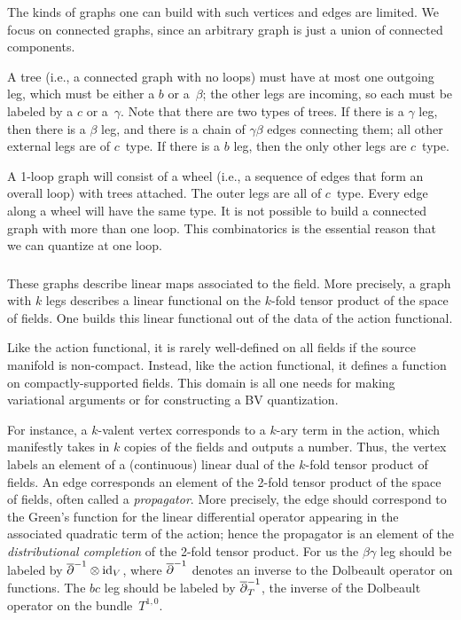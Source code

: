 The kinds of graphs one can build with such vertices and edges are limited.
We focus on connected graphs, since an arbitrary graph is just a union of connected components.

A tree (i.e., a connected graph with no loops) must have at most one outgoing leg,
which must be either a $b$ or a~$\beta$;
the other legs are incoming, so each must be labeled by a $c$ or a~$\gamma$.
Note that there are two types of trees.
If there is a $\gamma$ leg, then there is a $\beta$ leg,
and there is a chain of $\gamma\beta$ edges connecting them;
all other external legs are of $c$~type.
If there is a $b$ leg, then the only other legs are $c$~type.

A 1-loop graph will consist of a wheel (i.e., a sequence of edges that form an overall loop)
with trees attached.
The outer legs are all of $c$~type.
Every edge along a wheel will have the same type.
It is not possible to build a connected graph with more than one loop.
This combinatorics is the essential reason that we can quantize at one loop.

\subsubsection{}

These graphs describe linear maps associated to the field.
More precisely, a graph with $k$ legs describes a linear functional on the $k$-fold tensor product of the space of fields.
One builds this linear functional out of the data of the action functional.

\begin{rmk}
Like the action functional, it is rarely well-defined on all fields if the source manifold is non-compact.
Instead, like the action functional, it defines a function on compactly-supported fields.
This domain is all one needs for making variational arguments or for constructing a BV quantization.
\end{rmk}

For instance, a $k$-valent vertex corresponds to a $k$-ary term in the action,
which manifestly takes in $k$ copies of the fields and outputs a number.
Thus, the vertex labels an element of a (continuous) linear dual of the $k$-fold tensor product of fields.
An edge corresponds an element of the 2-fold tensor product of the space of fields,
often called a {\em propagator}.
More precisely, the edge should correspond to
the Green's function for the linear differential operator 
appearing in the associated quadratic term of the action;
hence the propagator is an element of the {\em distributional completion} of the 2-fold tensor product.
For us the $\beta\gamma$ leg should be labeled by $\overline{\partial}^{-1} \otimes {\rm id}_V$,
where $\overline{\partial}^{-1}$ denotes an inverse to the Dolbeault operator on functions.
The $bc$ leg should be labeled by $\overline{\partial}^{-1}_T$, 
the inverse of the Dolbeault operator on the bundle~$T^{1,0}$.

